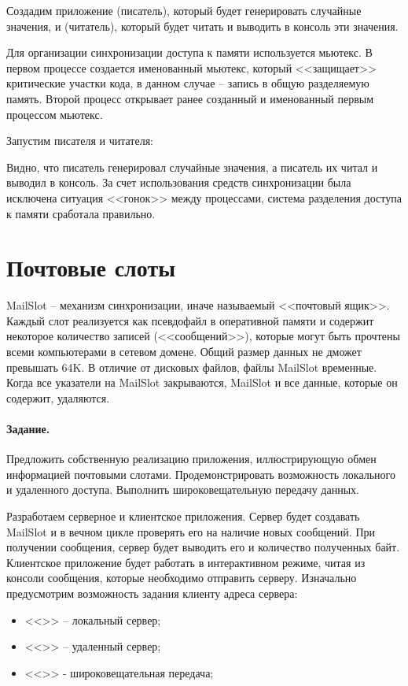 Создадим приложение  (писатель), который будет генерировать случайные значения, и  (читатель), который будет читать и выводить в консоль эти значения.

Для организации синхронизации доступа к памяти используется мьютекс. В первом процессе создается именованный мьютекс, который <<защищает>> критические участки кода, в данном случае -- запись в общую разделяемую память. Второй процесс открывает ранее созданный и именованный первым процессом мьютекс.





Запустим писателя и читателя:





Видно, что писатель генерировал случайные значения, а писатель их читал и выводил в консоль. За счет использования средств синхронизации была исключена ситуация <<гонок>> между процессами, система разделения доступа к памяти сработала правильно.

\section{Почтовые слоты}

MailSlot -- механизм синхронизации, иначе называемый <<почтовый ящик>>. Каждый слот реализуется как псевдофайл в оперативной памяти и содержит некоторое количество записей (<<сообщений>>), которые могут быть прочтены всеми компьютерами в сетевом домене. Общий размер данных не дможет превышать 64K. В отличие от дисковых файлов, файлы MailSlot временные. Когда все указатели на MailSlot закрываются, MailSlot и все данные, которые он содержит, удаляются.

\paragraph{Задание.} Предложить собственную реализацию приложения, иллюстрирующую обмен информацией почтовыми слотами. Продемонстрировать возможность локального и удаленного доступа. Выполнить широковещательную передачу данных.

Разработаем серверное и клиентское приложения. Сервер будет создавать MailSlot и в вечном цикле проверять его на наличие новых сообщений. При получении сообщения, сервер будет выводить его и количество полученных байт. Клиентское приложение будет работать в интерактивном режиме, читая из консоли сообщения, которые необходимо отправить серверу. Изначально предусмотрим возможность задания клиенту адреса сервера:
\begin{itemize}
	\item <<{\Large{}}>> -- локальный сервер;
	\item <<>> -- удаленный сервер;
	\item <<\code{*}>> - широковещательная передача;
\end{itemize} 

